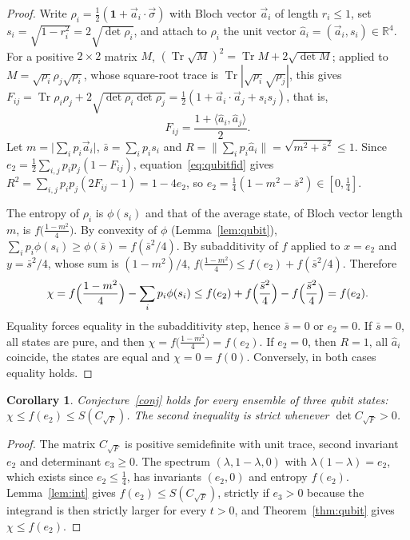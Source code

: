 \documentclass[11pt,a4paper]{article}
\newtheorem{corollary}[theorem]{Corollary}
\theoremstyle{definition}
\theoremstyle{plain}
\DeclareMathOperator{\Tr}{Tr}
\newcommand{\one}{\mathbf{1}}
\newcommand{\R}{\mathbb{R}}
\newcommand{\CF}{C_{\sqrt F}}
\begin{document}
\begin{proof}
Write $\rho_i=\tfrac12(\one+\vec a_i\cdot\vec\sigma)$ with Bloch vector
$\vec a_i$ of length $r_i\le1$, set $s_i=\sqrt{1-r_i^2}=2\sqrt{\det\rho_i}$, and
attach to $\rho_i$ the unit vector $\hat a_i=(\vec a_i,s_i)\in\R^4$. For a
positive $2\times2$ matrix $M$, $(\Tr\sqrt M)^2=\Tr M+2\sqrt{\det M}$; applied
to $M=\sqrt{\rho_i}\rho_j\sqrt{\rho_i}$, whose square-root trace is
$\Tr|\sqrt{\rho_i}\sqrt{\rho_j}|$, this gives
$F_{ij}=\Tr\rho_i\rho_j+2\sqrt{\det\rho_i\det\rho_j}
=\tfrac12(1+\vec a_i\cdot\vec a_j+s_is_j)$, that is,
\begin{equation}\label{eq:qubitfid}
F_{ij}=\frac{1+\langle\hat a_i,\hat a_j\rangle}{2}.
\end{equation}
Let $m=\bigl|\sum_ip_i\vec a_i\bigr|$, $\bar s=\sum_ip_is_i$ and
$R=\bigl\|\sum_ip_i\hat a_i\bigr\|=\sqrt{m^2+\bar s^2}\le1$. Since
$e_2=\tfrac12\sum_{i,j}p_ip_j(1-F_{ij})$, equation~\eqref{eq:qubitfid} gives
$R^2=\sum_{i,j}p_ip_j(2F_{ij}-1)=1-4e_2$, so
$e_2=\tfrac14(1-m^2-\bar s^2)\in[0,\tfrac14]$.

The entropy of $\rho_i$ is $\phi(s_i)$ and that of the average state, of Bloch
vector length $m$, is $f\bigl(\tfrac{1-m^2}{4}\bigr)$. By convexity of $\phi$
(Lemma~\ref{lem:qubit}), $\sum_ip_i\phi(s_i)\ge\phi(\bar s)=f(\bar s^2/4)$. By
subadditivity of $f$ applied to $x=e_2$ and $y=\bar s^2/4$, whose sum is
$(1-m^2)/4$,
$f\bigl(\tfrac{1-m^2}{4}\bigr)\le f(e_2)+f(\bar s^2/4)$. Therefore
\[
\chi=f\Bigl(\frac{1-m^2}{4}\Bigr)-\sum_ip_i\phi(s_i)
\le f(e_2)+f\Bigl(\frac{\bar s^2}{4}\Bigr)-f\Bigl(\frac{\bar s^2}{4}\Bigr)=f(e_2).
\]
Equality forces equality in the subadditivity step, hence $\bar s=0$ or
$e_2=0$. If $\bar s=0$, all states are pure, and then
$\chi=f\bigl(\tfrac{1-m^2}{4}\bigr)=f(e_2)$. If $e_2=0$, then $R=1$, all
$\hat a_i$ coincide, the states are equal and $\chi=0=f(0)$. Conversely, in
both cases equality holds.
\end{proof}

\begin{corollary}\label{cor:conj}
Conjecture~\ref{conj} holds for every ensemble of three qubit states:
$\chi\le f(e_2)\le S(\CF)$. The second inequality is strict whenever
$\det\CF>0$.
\end{corollary}

\begin{proof}
The matrix $\CF$ is positive semidefinite \cite{FdMRZ2012} with unit trace,
second invariant $e_2$ and determinant $e_3\ge0$. The spectrum
$(\lambda,1-\lambda,0)$ with $\lambda(1-\lambda)=e_2$, which exists since
$e_2\le\tfrac14$, has invariants $(e_2,0)$ and entropy $f(e_2)$.
Lemma~\ref{lem:int} gives $f(e_2)\le S(\CF)$, strictly if $e_3>0$ because the
integrand is then strictly larger for every $t>0$, and
Theorem~\ref{thm:qubit} gives $\chi\le f(e_2)$.
\end{proof}
\end{document}
